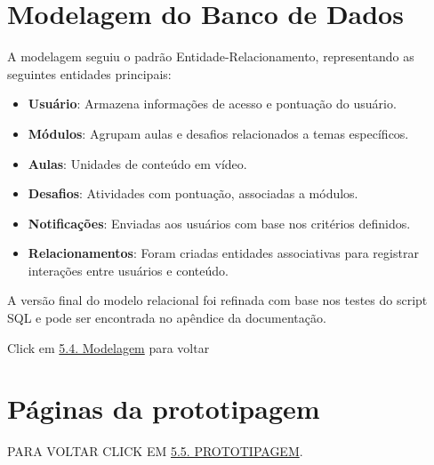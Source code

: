 \documentclass[
	article,			%
	12pt,				%
	oneside,			%
	a4paper,			%
	english,			%
	brazil,				%
	sumario=tradicional
	]{abntex2}
\begin{document}
\begin{apendicesenv}
{}
    
\newpage
\chapter{Modelagem do Banco de Dados}
\hypertarget{apendiceB}{}  %
\vspace*{-10mm}

{\fontsize{17pt}{19pt}\selectfont
A modelagem seguiu o padrão Entidade-Relacionamento, representando as seguintes entidades principais:

\begin{itemize}[leftmargin=0pt,labelsep=5pt]
    \item \textbf{Usuário}: Armazena informações de acesso e pontuação do usuário.
    \item \textbf{Módulos}: Agrupam aulas e desafios relacionados a temas específicos.
    \item \textbf{Aulas}: Unidades de conteúdo em vídeo.
    \item \textbf{Desafios}: Atividades com pontuação, associadas a módulos.
    \item \textbf{Notificações}: Enviadas aos usuários com base nos critérios definidos.
    \item \textbf{Relacionamentos}: Foram criadas entidades associativas para registrar interações entre usuários e conteúdo.
\end{itemize}

A versão final do modelo relacional foi refinada com base nos testes do script SQL e pode ser encontrada no apêndice da documentação.

\vspace{10mm} 
\begin{center}
    {\fontsize{20pt}{22pt}\selectfont Click em \hyperlink{sec:modelagem}{5.4. Modelagem} para voltar}
\end{center}
}

\newpage
\chapter{Páginas da prototipagem}
\hypertarget{apendiceC}{} %
\vspace*{-5mm} 
  {\Large \centering PARA VOLTAR CLICK EM \hyperlink{sec:prot}{5.5. PROTOTIPAGEM}. \par}
  
\begin{figure}[!htbp]
    \centering


\end{figure}
\end{apendicesenv}
\end{document}

